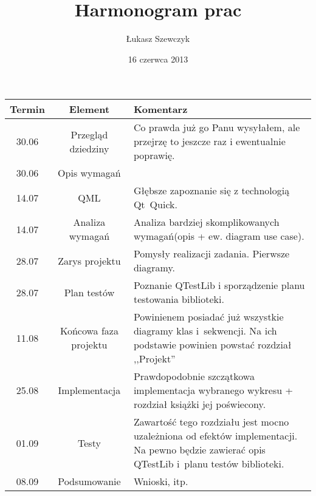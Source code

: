 \documentclass[11pt,twoside,a4paper,final]{article}
\begin{document}
\date{16 czerwca 2013}
\title{Harmonogram prac}

\author{Łukasz Szewczyk}

\maketitle

\begin{tabular}{|c|c|p{8cm}|}
\hline
Termin & Element & Komentarz\\
\hline
30.06 & Przegląd dziedziny & Co prawda już go Panu wysyłałem, 
ale przejrzę to jeszcze raz i ewentualnie poprawię. \\
\hline
30.06 & Opis wymagań &  \\
\hline
14.07 & QML & Głębsze zapoznanie się z technologią Qt~Quick. \\
\hline
14.07 & Analiza wymagań & Analiza bardziej skomplikowanych wymagań(opis + ew. diagram use case). \\
\hline
28.07 & Zarys projektu & Pomysły realizacji zadania. Pierwsze diagramy. \\
\hline
28.07 & Plan testów & Poznanie QTestLib i sporządzenie planu testowania biblioteki. \\
\hline
11.08 & Końcowa faza projektu & Powinienem posiadać już wszystkie diagramy klas i~sekwencji. Na ich podstawie powinien powstać rozdział ,,Projekt''\\
\hline
25.08 & Implementacja & Prawdopodobnie szczątkowa implementacja wybranego wykresu + rozdział książki jej poświecony. \\
\hline
01.09 & Testy & Zawartość tego rozdziału jest mocno uzależniona od efektów implementacji.
Na pewno będzie zawierać opis QTestLib i~planu testów biblioteki.  \\
\hline
08.09 & Podsumowanie & Wnioski, itp.\\
\hline
\end{tabular}
\end{document}
